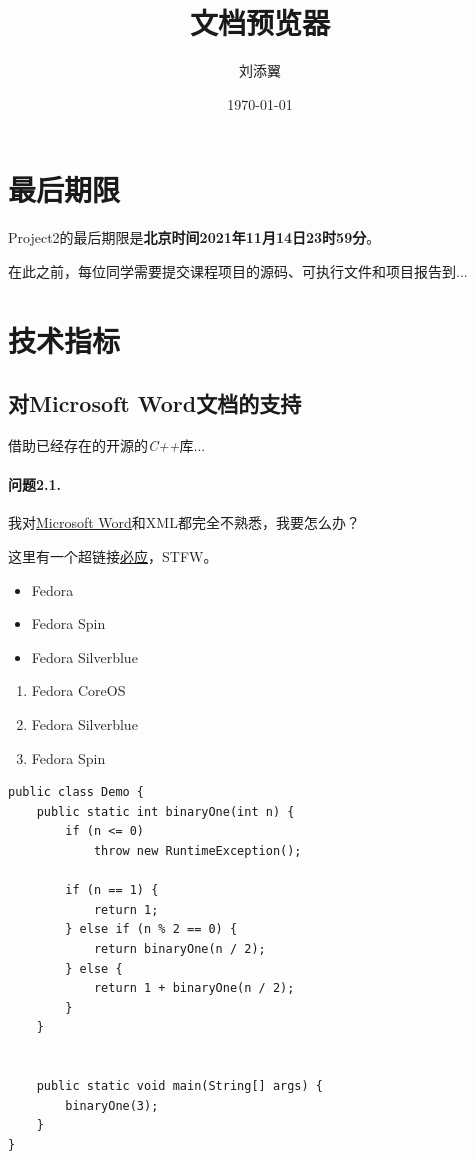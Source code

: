 \documentclass[UTF8]{ctexart}
\title{文档预览器}
\author{刘添翼}
\date{\today}
\begin{document}
\maketitle
\tableofcontents
\section{最后期限}
Project2的最后期限是\textbf{北京时间2021年11月14日23时59分}。


在此之前，每位同学需要提交课程项目的源码、可执行文件和项目报告到...

\section{技术指标}

\subsection{对Microsoft Word文档的支持}
借助已经存在的开源的\emph{C++}库...

\paragraph{问题2.1.}
我对\underline{Microsoft Word}和XML都完全不熟悉，我要怎么办？

这里有一个超链接\href{https://cn.bing.com/}{必应}，STFW。

\begin{itemize}
    \item Fedora
    \item Fedora Spin
    \item Fedora Silverblue
\end{itemize}

\begin{enumerate}
    \item Fedora CoreOS
    \item Fedora Silverblue
    \item Fedora Spin
\end{enumerate}

\begin{lstlisting}
public class Demo {
    public static int binaryOne(int n) {
        if (n <= 0)
            throw new RuntimeException();

        if (n == 1) {
            return 1;
        } else if (n % 2 == 0) {
            return binaryOne(n / 2);
        } else {
            return 1 + binaryOne(n / 2);
        }
    }


    public static void main(String[] args) {
        binaryOne(3);
    }
}
\end{lstlisting}
\end{document}

